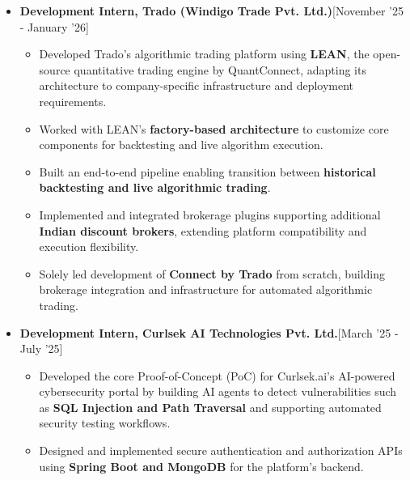 \documentclass[a4paper,10pt]{article}
\newcommand{\isep}{-2 pt}
\begin{document}
\begin{itemize}
    \item \textbf{Development Intern, Trado (Windigo Trade Pvt. Ltd.)}\hfill [November '25 - January '26]
    \\[-0.6cm]

    \begin{itemize}\itemsep \isep

        \item Developed Trado's algorithmic trading platform using \textbf{LEAN}, the open-source quantitative trading engine by QuantConnect, adapting its architecture to company-specific infrastructure and deployment requirements.

        \item Worked with LEAN's \textbf{factory-based architecture} to customize core components for backtesting and live algorithm execution.

        \item Built an end-to-end pipeline enabling transition between \textbf{historical backtesting and live algorithmic trading}.

        \item Implemented and integrated brokerage plugins supporting additional \textbf{Indian discount brokers}, extending platform compatibility and execution flexibility.

        \item Solely led development of \textbf{Connect by Trado} from scratch, building brokerage integration and infrastructure for automated algorithmic trading.

    \end{itemize}



    \item \textbf{Development Intern, Curlsek AI Technologies Pvt. Ltd.}\hfill [March '25 - July '25]
    \\[-0.6cm]

    \begin{itemize}\itemsep \isep

        \item Developed the core Proof-of-Concept (PoC) for Curlsek.ai's AI-powered cybersecurity portal by building AI agents to detect vulnerabilities such as \textbf{SQL Injection and Path Traversal} and supporting automated security testing workflows.

        \item Designed and implemented secure authentication and authorization APIs using \textbf{Spring Boot and MongoDB} for the platform's backend.


\end{itemize}
\end{itemize}
\end{document}
